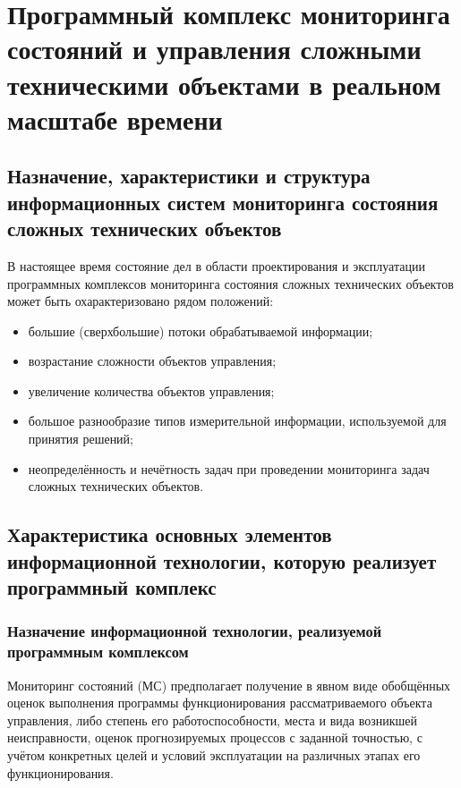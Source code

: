 \appendix
\chapter{Программный комплекс мониторинга состояний и управления
  сложными техническими объектами в реальном масштабе времени} 
\section{Назначение, характеристики и структура информационных систем
  мониторинга состояния сложных технических объектов}

В настоящее время состояние дел в области проектирования и
эксплуатации программных комплексов мониторинга состояния сложных
технических объектов может быть охарактеризовано рядом положений:
\begin{itemize}
\item большие (сверхбольшие) потоки обрабатываемой информации;
\item возрастание сложности объектов управления;
\item увеличение количества объектов управления;
\item большое разнообразие типов измерительной информации,
  используемой для принятия решений;
\item неопределённость и нечётность задач при проведении мониторинга
  задач сложных технических  объектов.
\end{itemize}


\section{Характеристика основных элементов информационной технологии,
  которую реализует программный комплекс}

\subsection{Назначение информационной технологии, реализуемой
  программным комплексом}

Мониторинг состояний (МС) предполагает получение в явном виде
обобщённых оценок выполнения программы функционирования
рассматриваемого объекта управления, либо степень его
работоспособности, места и вида возникшей неисправности, оценок
прогнозируемых процессов с заданной точностью, с учётом конкретных
целей и условий эксплуатации на различных этапах его функционирования.

